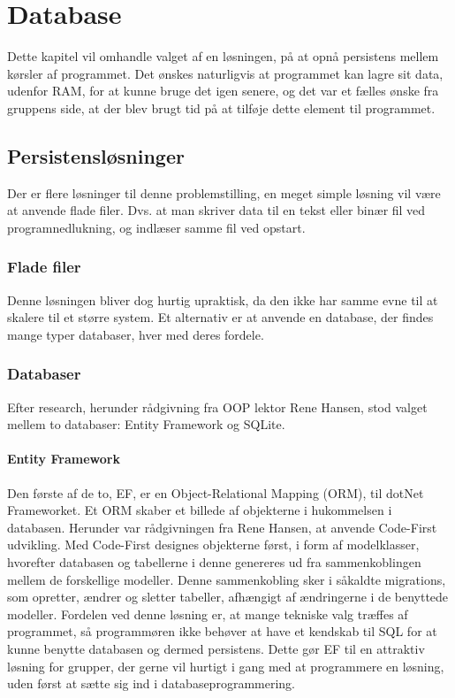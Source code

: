 \chapter{Database}\label{chap:database}

Dette kapitel vil omhandle valget af en løsningen, på at opnå persistens mellem kørsler af programmet.
Det ønskes naturligvis at programmet kan lagre sit data, udenfor RAM, for at kunne bruge det igen senere, og det var et fælles ønske fra gruppens side, at der blev brugt tid på at tilføje dette element til programmet.

\section{Persistensløsninger}

Der er flere løsninger til denne problemstilling, en meget simple løsning vil være at anvende flade filer. 
Dvs. at man skriver data til en tekst eller binær fil ved programnedlukning, og indlæser samme fil ved opstart.

\subsection{Flade filer}
Denne løsningen bliver dog hurtig upraktisk, da den ikke har samme evne til at skalere til et større system.
Et alternativ er at anvende en database, der findes mange typer databaser, hver med deres fordele.

\subsection{Databaser}
Efter research, herunder rådgivning fra OOP lektor Rene Hansen, stod valget mellem to databaser: Entity Framework og SQLite.

\subsubsection*{Entity Framework}
Den første af de to, \ac{EF}, er en Object-Relational Mapping (ORM), til dotNet Frameworket.
Et ORM skaber et billede af objekterne i hukommelsen i databasen. 
Herunder var rådgivningen fra Rene Hansen, at anvende Code-First udvikling.
Med Code-First designes objekterne først, i form af modelklasser, hvorefter databasen og tabellerne i denne genereres ud fra sammenkoblingen mellem de forskellige modeller. Denne sammenkobling sker i såkaldte migrations, som opretter, ændrer og sletter tabeller, afhængigt af ændringerne i de benyttede modeller.
Fordelen ved denne løsning er, at mange tekniske valg træffes af programmet, så programmøren ikke behøver at have et kendskab til \ac{SQL} for at kunne benytte databasen og dermed persistens.
Dette gør \ac{EF} til en attraktiv løsning for grupper, der gerne vil hurtigt i gang med at programmere en løsning, uden først at sætte sig ind i databaseprogrammering.

